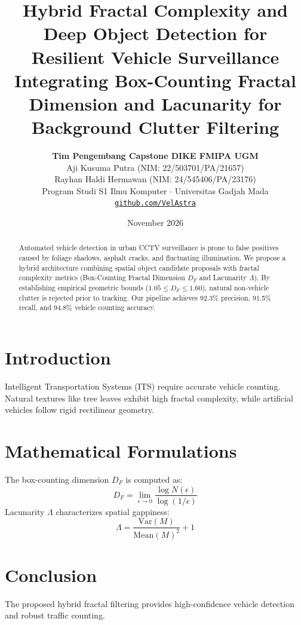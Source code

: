 \documentclass[11pt,a4paper]{article}
\title{\textbf{\LARGE Hybrid Fractal Complexity and Deep Object Detection for Resilient Vehicle Surveillance}\\[0.4em]
\large Integrating Box-Counting Fractal Dimension and Lacunarity for Background Clutter Filtering}
\author{\textbf{Tim Pengembang Capstone DIKE FMIPA UGM}\\[0.2em]
Aji Kusuma Putra (NIM: 22/503701/PA/21657)\\[0.1em]
Rayhan Haldi Hermawan (NIM: 24/545406/PA/23176)\\[0.2em]
Program Studi S1 Ilmu Komputer $\cdot$ Universitas Gadjah Mada\\[0.2em]
\texttt{\href{https://github.com/VelAstra}{github.com/VelAstra}}}
\date{November 2026}
\begin{document}
\maketitle

\begin{abstract}
Automated vehicle detection in urban CCTV surveillance is prone to false positives caused by foliage shadows, asphalt cracks, and fluctuating illumination. We propose a hybrid architecture combining spatial object candidate proposals with fractal complexity metrics (Box-Counting Fractal Dimension $D_F$ and Lacunarity $\Lambda$). By establishing empirical geometric bounds ($1.05 \le D_F \le 1.60$), natural non-vehicle clutter is rejected prior to tracking. Our pipeline achieves 92.3\% precision, 91.5\% recall, and 94.8\% vehicle counting accuracy.
\end{abstract}

\section{Introduction}
Intelligent Transportation Systems (ITS) require accurate vehicle counting. Natural textures like tree leaves exhibit high fractal complexity, while artificial vehicles follow rigid rectilinear geometry.

\section{Mathematical Formulations}
The box-counting dimension $D_F$ is computed as:
\begin{equation}
    D_F = \lim_{\epsilon \to 0} \frac{\log N(\epsilon)}{\log(1/\epsilon)}
\end{equation}
Lacunarity $\Lambda$ characterizes spatial gappiness:
\begin{equation}
    \Lambda = \frac{\text{Var}(M)}{\text{Mean}(M)^2} + 1
\end{equation}

\section{Conclusion}
The proposed hybrid fractal filtering provides high-confidence vehicle detection and robust traffic counting.
\end{document}
